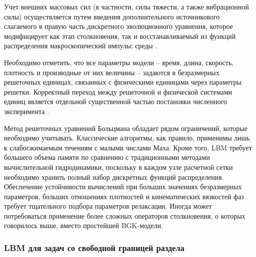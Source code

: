 \documentclass[12pt,a4paper]{article}
\begin{document}
Учет внешних массовых сил (в частности, силы тяжести, а также вибрационной силы) осуществляется путем введения дополнительного источникового слагаемого в правую часть дискретного эволюционного уравнения, которое модифицирует как этап столкновения, так и восстанавливаемый из функций распределения макроскопический импульс среды \cite{Krger2017, Succi2018}. 


Необходимо отметить, что все параметры модели -- время, длина, скорость, плотность и производные от них величины -- задаются в безразмерных решеточных единицах, связанных с физическими единицами через параметры решетки. Корректный переход между решеточной и физической системами единиц является отдельной существенной частью постановки численного эксперимента \cite{Krger2017, Succi2018}.

Метод решеточных уравнений Больцмана обладает рядом ограничений, которые необходимо учитывать. Классические алгоритмы, как правило, применимы лишь к слабосжимаемым течениям с малыми числами Маха. Кроме того, LBM требует большего объема памяти по сравнению с традиционными методами вычислительной гидродинамики, поскольку в каждом узле расчетной сетки необходимо хранить полный набор дискретных функций распределения. Обеспечение устойчивости вычислений при больших значениях безразмерных параметров, больших отношениях плотностей и кинематических вязкостей фаз требует тщательного подбора параметров релаксации. Иногда может потребоваться применение более сложных операторов столкновения, о которых говорилось выше, вместо простейшей BGK-модели.

\subsubsection{LBM для задач со свободной границей раздела} 
\end{document}
